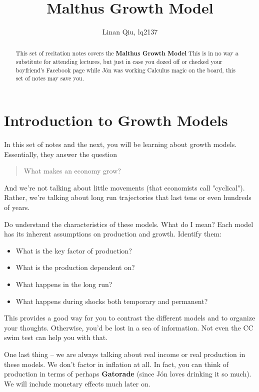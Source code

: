 \documentclass[11pt]{scrartcl}
\title{Malthus Growth Model}
\author{Linan Qiu, lq2137}
\newcommand{\jon}{Jón }
\begin{document}
\maketitle

\begin{abstract}
This set of recitation notes covers the \textbf{Malthus Growth Model } This is in no way a substitute for attending lectures, but just in case you dozed off or checked your boyfriend's Facebook page while \jon was working Calculus magic on the board, this set of notes may save you.
\end{abstract}

\section{Introduction to Growth Models}

In this set of notes and the next, you will be learning about growth models. Essentially, they answer the question

\begin{quote}
What makes an economy grow?
\end{quote}

And we're not talking about little movements (that economists call "cyclical"). Rather, we're talking about long run trajectories that last tens or even hundreds of years.

Do understand the characteristics of these models. What do I mean? Each model has its inherent assumptions on production and growth. Identify them:

\begin{itemize}
\item What is the key factor of production?
\item What is the production dependent on?
\item What happens in the long run?
\item What happens during shocks both temporary and permanent?
\end{itemize}

This provides a good way for you to contrast the different models and to organize your thoughts. Otherwise, you'd be lost in a sea of information. Not even the CC swim test can help you with that.

One last thing -- we are always talking about real income or real production in these models. We don't factor in inflation at all. In fact, you can think of production in terms of perhaps \textbf{Gatorade} (since \jon loves drinking it so much). We will include monetary effects much later on.
\end{document}
